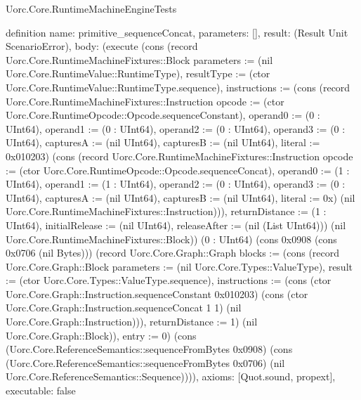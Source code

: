 \begin{lexlean}{Uorc.Core.RuntimeMachineEngineTests}
\begin{semanticmodule}
definition{
  name: primitive_sequenceConcat,
  parameters: [],
  result: (Result Unit ScenarioError),
  body: (execute (cons (record Uorc.Core.RuntimeMachineFixtures::Block {parameters := (nil Uorc.Core.RuntimeValue::RuntimeType), resultType := (ctor Uorc.Core.RuntimeValue::RuntimeType.sequence), instructions := (cons (record Uorc.Core.RuntimeMachineFixtures::Instruction {opcode := (ctor Uorc.Core.RuntimeOpcode::Opcode.sequenceConstant), operand0 := (0 : UInt64), operand1 := (0 : UInt64), operand2 := (0 : UInt64), operand3 := (0 : UInt64), capturesA := (nil UInt64), capturesB := (nil UInt64), literal := 0x010203}) (cons (record Uorc.Core.RuntimeMachineFixtures::Instruction {opcode := (ctor Uorc.Core.RuntimeOpcode::Opcode.sequenceConcat), operand0 := (1 : UInt64), operand1 := (1 : UInt64), operand2 := (0 : UInt64), operand3 := (0 : UInt64), capturesA := (nil UInt64), capturesB := (nil UInt64), literal := 0x}) (nil Uorc.Core.RuntimeMachineFixtures::Instruction))), returnDistance := (1 : UInt64), initialRelease := (nil UInt64), releaseAfter := (nil (List UInt64))}) (nil Uorc.Core.RuntimeMachineFixtures::Block)) (0 : UInt64) (cons 0x0908 (cons 0x0706 (nil Bytes))) (record Uorc.Core.Graph::Graph {blocks := (cons (record Uorc.Core.Graph::Block {parameters := (nil Uorc.Core.Types::ValueType), result := (ctor Uorc.Core.Types::ValueType.sequence), instructions := (cons (ctor Uorc.Core.Graph::Instruction.sequenceConstant 0x010203) (cons (ctor Uorc.Core.Graph::Instruction.sequenceConcat 1 1) (nil Uorc.Core.Graph::Instruction))), returnDistance := 1}) (nil Uorc.Core.Graph::Block)), entry := 0}) (cons (Uorc.Core.ReferenceSemantics::sequenceFromBytes 0x0908) (cons (Uorc.Core.ReferenceSemantics::sequenceFromBytes 0x0706) (nil Uorc.Core.ReferenceSemantics::Sequence)))),
  axioms: [Quot.sound, propext],
  executable: false
}


\end{semanticmodule}
\end{lexlean}
